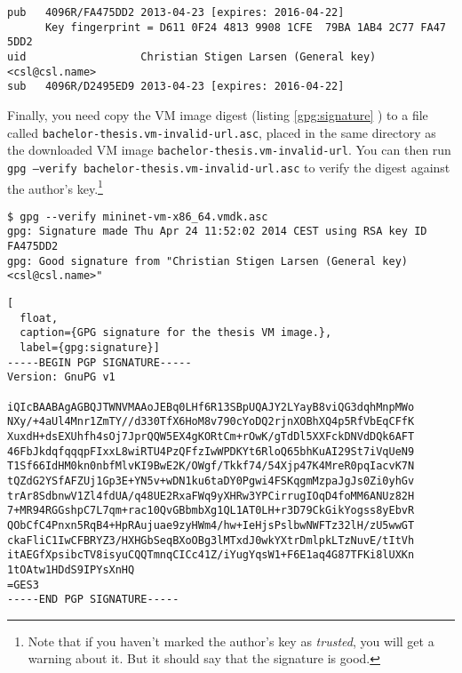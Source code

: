 \begin{lstlisting}[label={gpg:key.fingerprint}]
pub   4096R/FA475DD2 2013-04-23 [expires: 2016-04-22]
      Key fingerprint = D611 0F24 4813 9908 1CFE  79BA 1AB4 2C77 FA47 5DD2
uid                  Christian Stigen Larsen (General key) <csl@csl.name>
sub   4096R/D2495ED9 2013-04-23 [expires: 2016-04-22]
\end{lstlisting}

Finally, you need copy the VM image digest (listing \ref{gpg:signature}
) to a file called
\texttt{bachelor-thesis.vm-invalid-url.asc}, placed in the same directory as
the downloaded VM image \texttt{bachelor-thesis.vm-invalid-url}.  You can then run
\texttt{gpg --verify bachelor-thesis.vm-invalid-url.asc} to verify the
digest against the author's key.\footnote{Note that if you haven't marked the
author's key as \textit{trusted}, you will get a warning about it.
But it should say that the signature is good.}

\begin{Verbatim}
$ gpg --verify mininet-vm-x86_64.vmdk.asc
gpg: Signature made Thu Apr 24 11:52:02 2014 CEST using RSA key ID FA475DD2
gpg: Good signature from "Christian Stigen Larsen (General key) <csl@csl.name>"
\end{Verbatim}

\begin{lstlisting}[
  float,
  caption={GPG signature for the thesis VM image.},
  label={gpg:signature}]
-----BEGIN PGP SIGNATURE-----
Version: GnuPG v1

iQIcBAABAgAGBQJTWNVMAAoJEBq0LHf6R13SBpUQAJY2LYayB8viQG3dqhMnpMWo
NXy/+4aUl4Mnr1ZmTY//d330TfX6HoM8v790cYoDQ2rjnXOBhXQ4p5RfVbEqCFfK
XuxdH+dsEXUhfh4sOj7JprQQW5EX4gKORtCm+rOwK/gTdDl5XXFckDNVdDQk6AFT
46FbJkdqfqqqpFIxxL8wiRTU4PzQFfzIwWPDKYt6RloQ65bhKuAI29St7iVqUeN9
T1Sf66IdHM0kn0nbfMlvKI9BwE2K/OWgf/Tkkf74/54Xjp47K4MreR0pqIacvK7N
tQZdG2YSfAFZUj1Gp3E+YN5v+wDN1ku6taDY0Pgwi4FSKqgmMzpaJgJs0Zi0yhGv
trAr8SdbnwV1Zl4fdUA/q48UE2RxaFWq9yXHRw3YPCirrugIOqD4foMM6ANUz82H
7+MR94RGGshpC7L7qm+rac10QvGBbmbXg1QL1AT0LH+r3D79CkGikYogss8yEbvR
QObCfC4Pnxn5RqB4+HpRAujuae9zyHWm4/hw+IeHjsPslbwNWFTz32lH/zU5wwGT
ckaFliC1IwCFBRYZ3/HXHGbSeqBXoOBg3lMTxdJ0wkYXtrDmlpkLTzNuvE/tItVh
itAEGfXpsibcTV8isyuCQQTmnqCICc41Z/iYugYqsW1+F6E1aq4G87TFKi8lUXKn
1tOAtw1HDdS9IPYsXnHQ
=GES3
-----END PGP SIGNATURE-----
\end{lstlisting}

